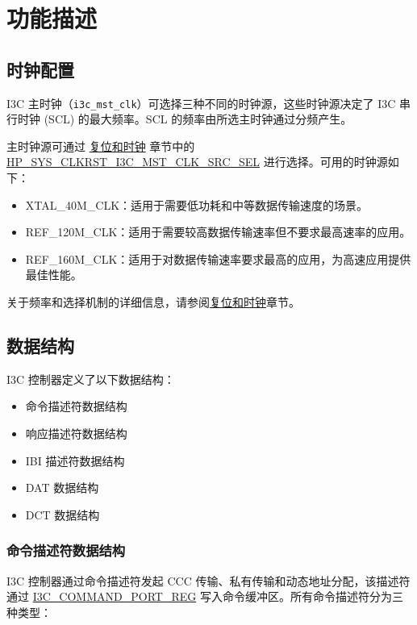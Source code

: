 \documentclass[main\_\_CN.tex]{subfiles}
\begin{document}
\section{功能描述}
\label{sec:i3c-func-descr}

\subsection{时钟配置}

I3C 主时钟（\texttt{i3c\_mst\_clk}）可选择三种不同的时钟源，这些时钟源决定了 I3C 串行时钟 (SCL) 的最大频率。SCL 的频率由所选主时钟通过分频产生。

主时钟源可通过 \hyperref[mod:resclk]{复位和时钟} 章节中的 \hyperref[fielddesc:HPSYSCLKRSTI3CMSTCLKSRCSEL]{HP\_SYS\_CLKRST\_I3C\_MST\_CLK\_SRC\_SEL} 进行选择。可用的时钟源如下：

\begin{itemize}
    \item XTAL\_40M\_CLK：适用于需要低功耗和中等数据传输速度的场景。
    \item REF\_120M\_CLK：适用于需要较高数据传输速率但不要求最高速率的应用。
    \item REF\_160M\_CLK：适用于对数据传输速率要求最高的应用，为高速应用提供最佳性能。
\end{itemize}

关于频率和选择机制的详细信息，请参阅\hyperref[mod:resclk]{复位和时钟}章节。


\subsection{数据结构}

I3C 控制器定义了以下数据结构：
\begin{itemize}
    \item 命令描述符数据结构
    \item 响应描述符数据结构
    \item IBI 描述符数据结构
    \item DAT 数据结构
    \item DCT 数据结构
\end{itemize}

\subsubsection{命令描述符数据结构}

I3C 控制器通过命令描述符发起 CCC 传输、私有传输和动态地址分配，该描述符通过 \hyperref[regdesc:I3CMSTMEMCOMMANDBUFPORTREG]{I3C\_COMMAND\_PORT\_REG} 写入命令缓冲区。所有命令描述符分为三种类型：
\end{document}
